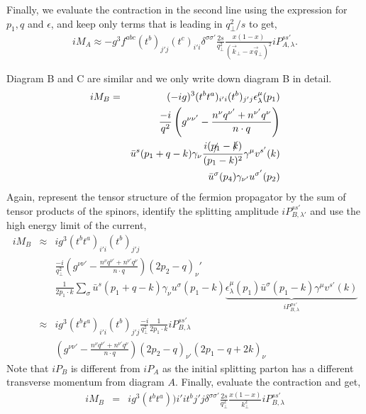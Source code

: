 Finally, we evaluate the contraction in the second line using the expression for $p_1, q$ and $\epsilon$, and keep only terms that is leading in $q_\perp^2/s$ to get,
\begin{eqnarray}
i M_A \approx -g^3 f^{abc}(t^b)_{j'j}(t^c)_{i'i}\delta^{\sigma\sigma'}\frac{2s}{q_\perp^2} \frac{x(1-x)}{(\vec{k}_\perp-x \vec{q}_\perp)^2} iP_{A,\lambda}^{ss'}.
\end{eqnarray}

Diagram B and C are similar and we only write down diagram B in detail.
\begin{eqnarray}
i M_B &=& (-ig)^3 (t^bt^a)_{i'i}(t^b)_{j'j} \epsilon_\lambda^\mu(p_1) \\\nonumber
&&\frac{-i}{q^2}\left(g^{\nu\nu'}-\frac{n^{\nu}q^{\nu'}+n^{\nu'}q^\nu}{n\cdot q}\right) \\\nonumber
&&\bar{u}^s(p_1+q-k)\gamma_{\nu}\frac{i(\slashed{p_1}-\slashed{k})}{(p_1-k)^2}\gamma^{\mu}v^{s'}(k) \\ \nonumber
&&\bar{u}^{\sigma}(p_4)\gamma_{\nu'}u^{\sigma'}(p_2)
\end{eqnarray}
Again, represent the tensor structure of the fermion propagator by the sum of tensor products of the spinors, identify the splitting amplitude $iP_{B,\lambda'}^{ss'}$ and use the high energy limit of the current,
\begin{eqnarray}
i M_B &\approx& ig^3 (t^bt^a)_{i'i}(t^b)_{j'j}  \\\nonumber
&&\frac{-i}{q_\perp^2}\left(g^{\nu\nu'}-\frac{n^{\nu}q^{\nu'}+n^{\nu'}q^\nu}{n\cdot q}\right) (2p_2-q)_\nu' \\\nonumber
&&\frac{1}{2p_1\cdot k} \sum_\sigma \bar{u}^s(p_1+q-k)\gamma_{\nu} u^{\sigma}(p_1-k) \underbrace{\epsilon_\lambda^\mu(p_1)\bar{u}^{\sigma}(p_1-k) \gamma^{\mu}v^{s'}(k)}_{iP_{B,\lambda}^{\sigma s'}}\\
&\approx& ig^3 (t^bt^a)_{i'i}(t^b)_{j'j} \frac{-i}{q_\perp^2}\frac{1}{2p_1\cdot k} iP_{B,\lambda}^{ss'}\\\nonumber
&&\left(g^{\nu\nu'}-\frac{n^{\nu}q^{\nu'}+n^{\nu'}q^\nu}{n\cdot q}\right) (2p_2-q)_{\nu'} (2p_1-q+2k)_\nu 
\end{eqnarray}
Note that $iP_{B}$ is different from $iP_{A}$ as the initial splitting parton has a different transverse momentum from diagram $A$.
Finally, evaluate the contraction and get,
\begin{eqnarray}
i M_B &=& i g^3 (t^b t^a)){i'i} t^b{j'j} \delta^{\sigma\sigma'} \frac{2s}{q_\perp^2} \frac{x(1-x)}{k_\perp^2}  iP_{B,\lambda}^{ss'}
\end{eqnarray}
